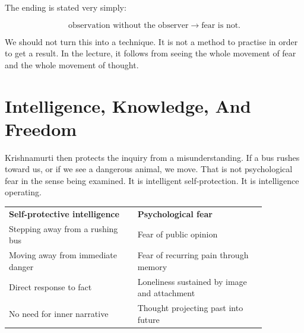 The ending is stated very simply:

\begin{equation}
\text{observation without the observer}
\longrightarrow
\text{fear is not}.
\end{equation}

We should not turn this into a technique. It is not a method to practise in order to get a result. In the lecture, it follows from seeing the whole movement of fear and the whole movement of thought.

\begin{figure}
\centering
{}
\end{figure}

\section{Intelligence, Knowledge, And Freedom}

Krishnamurti then protects the inquiry from a misunderstanding. If a bus rushes toward us, or if we see a dangerous animal, we move. That is not psychological fear in the sense being examined. It is intelligent self-protection. It is intelligence operating.

\begin{table}
\centering
\begin{tabular}{p{0.43\linewidth}p{0.43\linewidth}}
\textbf{Self-protective intelligence} & \textbf{Psychological fear} \\
Stepping away from a rushing bus & Fear of public opinion \\
Moving away from immediate danger & Fear of recurring pain through memory \\
Direct response to fact & Loneliness sustained by image and attachment \\
No need for inner narrative & Thought projecting past into future \\
\end{tabular}
\end{table}

